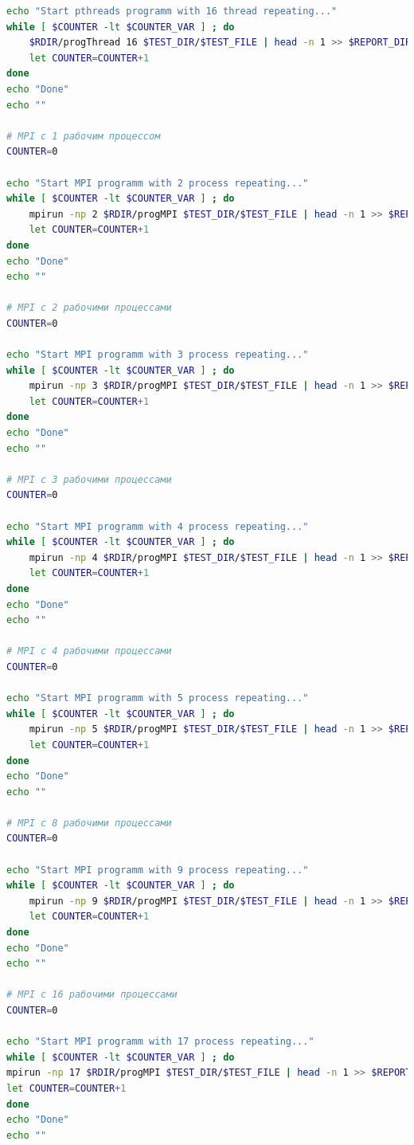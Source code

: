 \documentclass[12pt,a4paper]{report}
\begin{document}
\begin{lstlisting}[language=bash,caption={bash version},texcl=true,
				frame=single,
				breaklines=true,
				extendedchars=\true]
echo "Start pthreads programm with 16 thread repeating..."
while [ $COUNTER -lt $COUNTER_VAR ] ; do
    $RDIR/progThread 16 $TEST_DIR/$TEST_FILE | head -n 1 >> $REPORT_DIR/result.threads.16.repeate
    let COUNTER=COUNTER+1
done
echo "Done"
echo ""

# MPI с 1 рабочим процессом
COUNTER=0

echo "Start MPI programm with 2 process repeating..."
while [ $COUNTER -lt $COUNTER_VAR ] ; do
    mpirun -np 2 $RDIR/progMPI $TEST_DIR/$TEST_FILE | head -n 1 >> $REPORT_DIR/result.mpi.1.repeate
    let COUNTER=COUNTER+1
done
echo "Done"
echo ""

# MPI с 2 рабочими процессами
COUNTER=0

echo "Start MPI programm with 3 process repeating..."
while [ $COUNTER -lt $COUNTER_VAR ] ; do
    mpirun -np 3 $RDIR/progMPI $TEST_DIR/$TEST_FILE | head -n 1 >> $REPORT_DIR/result.mpi.2.repeate
    let COUNTER=COUNTER+1
done
echo "Done"
echo ""

# MPI с 3 рабочими процессами
COUNTER=0

echo "Start MPI programm with 4 process repeating..."
while [ $COUNTER -lt $COUNTER_VAR ] ; do
    mpirun -np 4 $RDIR/progMPI $TEST_DIR/$TEST_FILE | head -n 1 >> $REPORT_DIR/result.mpi.3.repeate
    let COUNTER=COUNTER+1
done
echo "Done"
echo ""

# MPI с 4 рабочими процессами
COUNTER=0

echo "Start MPI programm with 5 process repeating..."
while [ $COUNTER -lt $COUNTER_VAR ] ; do
    mpirun -np 5 $RDIR/progMPI $TEST_DIR/$TEST_FILE | head -n 1 >> $REPORT_DIR/result.mpi.4.repeate
    let COUNTER=COUNTER+1
done
echo "Done"
echo ""

# MPI с 8 рабочими процессами
COUNTER=0

echo "Start MPI programm with 9 process repeating..."
while [ $COUNTER -lt $COUNTER_VAR ] ; do
    mpirun -np 9 $RDIR/progMPI $TEST_DIR/$TEST_FILE | head -n 1 >> $REPORT_DIR/result.mpi.8.repeate
    let COUNTER=COUNTER+1
done
echo "Done"
echo ""

# MPI с 16 рабочими процессами
COUNTER=0

echo "Start MPI programm with 17 process repeating..."
while [ $COUNTER -lt $COUNTER_VAR ] ; do
mpirun -np 17 $RDIR/progMPI $TEST_DIR/$TEST_FILE | head -n 1 >> $REPORT_DIR/result.mpi.16.repeate
let COUNTER=COUNTER+1
done
echo "Done"
echo ""

		\end{lstlisting}
\end{document}
